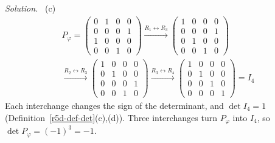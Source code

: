 \documentclass[12pt]{article}
\theoremstyle{definition}
\newenvironment{solution}{\par\noindent\textit{Solution.}\ }{\par\smallskip}
\begin{document}
\begin{solution}
(c)
\[
\begin{gathered}
P_\varphi=\begin{pmatrix}0&1&0&0\\0&0&0&1\\1&0&0&0\\0&0&1&0\end{pmatrix}
\xrightarrow{R_1\leftrightarrow R_3}
\begin{pmatrix}1&0&0&0\\0&0&0&1\\0&1&0&0\\0&0&1&0\end{pmatrix}
\\
\xrightarrow{R_2\leftrightarrow R_3}
\begin{pmatrix}1&0&0&0\\0&1&0&0\\0&0&0&1\\0&0&1&0\end{pmatrix}
\xrightarrow{R_3\leftrightarrow R_4}
\begin{pmatrix}1&0&0&0\\0&1&0&0\\0&0&1&0\\0&0&0&1\end{pmatrix}=I_4
\end{gathered}
\]
Each interchange changes the sign of the determinant, and \(\det I_4=1\) (Definition~\ref{r5d-def-det}(c),(d)). Three
interchanges turn \(P_\varphi\) into \(I_4\), so \(\det P_\varphi=(-1)^3=-1\).
\end{solution}
\end{document}
